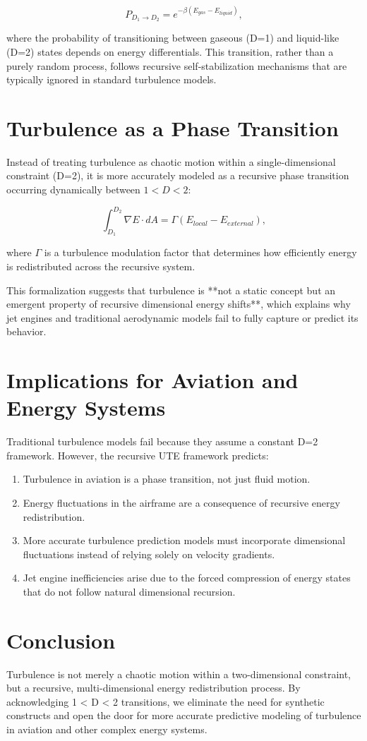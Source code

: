 \documentclass[letterpaper,12pt]{article}
\begin{document}
\begin{equation}
    P_{D_1 \to D_2} = e^{-\beta (E_{gas} - E_{liquid})},
\end{equation}

where the probability of transitioning between gaseous (D=1) and liquid-like (D=2) states depends on energy differentials. This transition, rather than a purely random process, follows recursive self-stabilization mechanisms that are typically ignored in standard turbulence models.

\section{Turbulence as a Phase Transition}
Instead of treating turbulence as chaotic motion within a single-dimensional constraint (D=2), it is more accurately modeled as a recursive phase transition occurring dynamically between $1 < D < 2$:

\begin{equation}
    \int_{D_1}^{D_2} \nabla E \cdot dA = \Gamma \left( E_{local} - E_{external} \right),
\end{equation}

where $\Gamma$ is a turbulence modulation factor that determines how efficiently energy is redistributed across the recursive system.

This formalization suggests that turbulence is **not a static concept but an emergent property of recursive dimensional energy shifts**, which explains why jet engines and traditional aerodynamic models fail to fully capture or predict its behavior.

\section{Implications for Aviation and Energy Systems}
Traditional turbulence models fail because they assume a constant D=2 framework. However, the recursive UTE framework predicts:

\begin{enumerate}
    \item Turbulence in aviation is a phase transition, not just fluid motion.
    \item Energy fluctuations in the airframe are a consequence of recursive energy redistribution.
    \item More accurate turbulence prediction models must incorporate dimensional fluctuations instead of relying solely on velocity gradients.
    \item Jet engine inefficiencies arise due to the forced compression of energy states that do not follow natural dimensional recursion.
\end{enumerate}

\section{Conclusion}
Turbulence is not merely a chaotic motion within a two-dimensional constraint, but a recursive, multi-dimensional energy redistribution process. By acknowledging 1 < D < 2 transitions, we eliminate the need for synthetic constructs and open the door for more accurate predictive modeling of turbulence in aviation and other complex energy systems.
\end{document}
